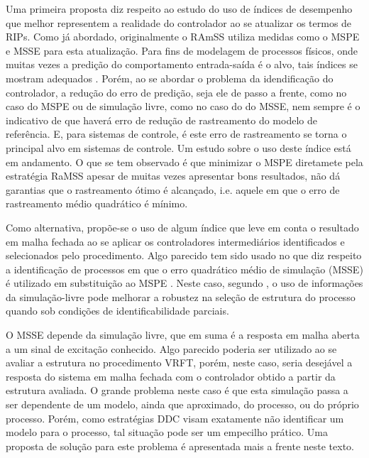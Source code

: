 Uma primeira proposta diz respeito ao estudo do uso de índices de desempenho que melhor representem a realidade do controlador ao se atualizar os termos de RIPs.
Como já abordado, originalmente o RAmSS utiliza medidas como o MSPE e MSSE para esta atualização.
Para fins de modelagem  de processos físicos, onde muitas vezes a predição do comportamento entrada-saída é o alvo, tais índices se mostram adequados \cite{falsone2015}.
%
Porém, ao se abordar o problema da idendificação do controlador, a redução do erro de predição, seja ele de passo a frente, como no caso do MSPE ou de simulação livre, como no caso do do MSSE, nem sempre é o indicativo de que haverá erro de redução de rastreamento do modelo de referência. E, para sistemas de controle, é este erro de rastreamento se torna o principal alvo em sistemas de controle.
%
%
Um estudo sobre o uso deste índice está em andamento. O que se tem observado é que minimizar o MSPE diretamete pela estratégia RaMSS apesar de muitas vezes apresentar bons resultados, não dá garantias que o rastreamento ótimo é alcançado, i.e. aquele em que o erro de rastreamento médio quadrático é mínimo. 

Como alternativa, propõe-se o uso de algum índice que leve em conta o resultado em malha fechada ao se aplicar os controladores intermediários identificados e selecionados pelo procedimento. Algo parecido tem sido usado no que diz respeito a identificação de processos  em que o erro quadrático médio de simulação (MSSE) é utilizado em substituição ao MSPE \citep{aguirre2010}. Neste caso, segundo \citep{piroddi2003}, o uso de informações da simulação-livre pode melhorar a robustez na seleção de estrutura do processo quando sob condições de identificabilidade parciais.    


O MSSE depende da simulação livre, que em suma é a resposta em malha aberta a um sinal de excitação conhecido. Algo parecido poderia ser utilizado ao se avaliar a estrutura no procedimento VRFT, porém, neste caso, seria desejável a resposta do sistema em malha fechada com o controlador obtido a partir da estrutura avaliada. O grande problema neste caso é que esta simulação passa a ser dependente de um modelo, ainda que aproximado, do processo, ou do próprio processo. Porém, como estratégias DDC visam exatamente não identificar um modelo para o processo, tal situação pode ser um empecilho prático. Uma proposta de solução para este problema é apresentada mais a frente neste texto.

